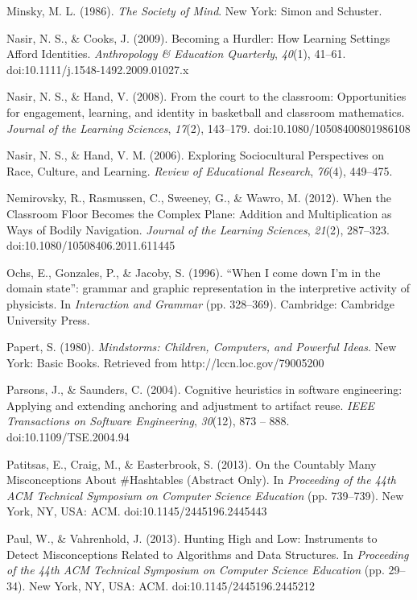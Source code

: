Minsky, M. L. (1986). \emph{The Society of Mind}. New York: Simon and
Schuster.

Nasir, N. S., \& Cooks, J. (2009). Becoming a Hurdler: How Learning
Settings Afford Identities. \emph{Anthropology \& Education Quarterly},
\emph{40}(1), 41--61. doi:10.1111/j.1548-1492.2009.01027.x

Nasir, N. S., \& Hand, V. (2008). From the court to the classroom:
Opportunities for engagement, learning, and identity in basketball and
classroom mathematics. \emph{Journal of the Learning Sciences},
\emph{17}(2), 143--179. doi:10.1080/10508400801986108

Nasir, N. S., \& Hand, V. M. (2006). Exploring Sociocultural
Perspectives on Race, Culture, and Learning. \emph{Review of Educational
Research}, \emph{76}(4), 449--475.

Nemirovsky, R., Rasmussen, C., Sweeney, G., \& Wawro, M. (2012). When
the Classroom Floor Becomes the Complex Plane: Addition and
Multiplication as Ways of Bodily Navigation. \emph{Journal of the
Learning Sciences}, \emph{21}(2), 287--323.
doi:10.1080/10508406.2011.611445

Ochs, E., Gonzales, P., \& Jacoby, S. (1996). ``When I come down I'm in
the domain state'': grammar and graphic representation in the
interpretive activity of physicists. In \emph{Interaction and Grammar}
(pp. 328--369). Cambridge: Cambridge University Press.

Papert, S. (1980). \emph{Mindstorms: Children, Computers, and Powerful
Ideas}. New York: Basic Books. Retrieved from
http://lccn.loc.gov/79005200

Parsons, J., \& Saunders, C. (2004). Cognitive heuristics in software
engineering: Applying and extending anchoring and adjustment to artifact
reuse. \emph{IEEE Transactions on Software Engineering}, \emph{30}(12),
873 -- 888. doi:10.1109/TSE.2004.94

Patitsas, E., Craig, M., \& Easterbrook, S. (2013). On the Countably
Many Misconceptions About \#Hashtables (Abstract Only). In
\emph{Proceeding of the 44th ACM Technical Symposium on Computer Science
Education} (pp. 739--739). New York, NY, USA: ACM.
doi:10.1145/2445196.2445443

Paul, W., \& Vahrenhold, J. (2013). Hunting High and Low: Instruments to
Detect Misconceptions Related to Algorithms and Data Structures. In
\emph{Proceeding of the 44th ACM Technical Symposium on Computer Science
Education} (pp. 29--34). New York, NY, USA: ACM.
doi:10.1145/2445196.2445212

